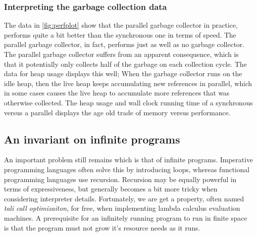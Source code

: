 \subsubsection{Interpreting the garbage collection data}
The data in \autoref{fig:perfplot} show that the parallel garbage collector in practice, performs quite a bit better than the synchronous one in terms of speed.
The parallel garbage collector, in fact, performs just as well as no garbage collector.
The parallel garbage collector suffers from an apparent consequence, which is that it potentially only collects half of the garbage on each collection cycle.
The data for heap usage displays this well; When the garbage collector runs on the idle heap, then the live heap keeps accumulating new references in parallel, which in some cases causes the live heap to accumulate more references that was otherwise collected.
The heap usage and wall clock running time of a synchronous versus a parallel displays the age old trade of memory versus performance.

\subsection{An invariant on infinite programs}\label{subsec:inf}
An important problem still remains which is that of infinite programs.
Imperative programming languages often solve this by introducing loops, whereas functional programming languages use recursion.
Recursion may be equally powerful in terms of expressiveness, but generally becomes a bit more tricky when considering interpreter details.
Fortunately, we are get a property, often named \textit{tali call optimizaiton}, for free, when implementing lambda calculus evaluation machines.
A prerequisite for an infinitely running program to run in finite space is that the program must not grow it's resource needs as it runs.

